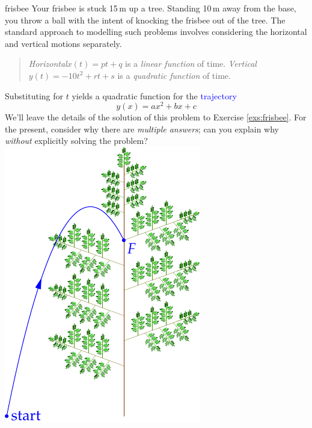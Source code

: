 \begin{example}[lower separated=false, sidebyside, sidebyside align=top seam, sidebyside gap=0pt, righthand width=0.3\linewidth]{}{frisbee}
Your frisbee is stuck 15\,m up a tree. Standing 10\,m away from the base, you throw a ball with the intent of knocking the frisbee out of the tree.\smallbreak
The standard approach to modelling such problems involves considering the horizontal and vertical motions separately.
\begin{quote}
\emph{Horizontal}\lstsp $x(t)=pt+q$ is a \emph{linear function} of time.\smallbreak
\emph{Vertical}\lstsp $y(t)=-10t^2+rt+s$ is a \emph{quadratic function} of time.
\end{quote}
Substituting for $t$ yields a quadratic function for the \textcolor{blue}{trajectory}
\[y(x)=ax^2+bx+c\]
We'll leave the details of the solution of this problem to Exercise \ref{exs:frisbee}. For the present, consider why there are \emph{multiple answers}; can you explain why \emph{without} explicitly solving the problem?
\tcblower
\flushright\includegraphics[scale=0.88]{tree1}
\end{example}


